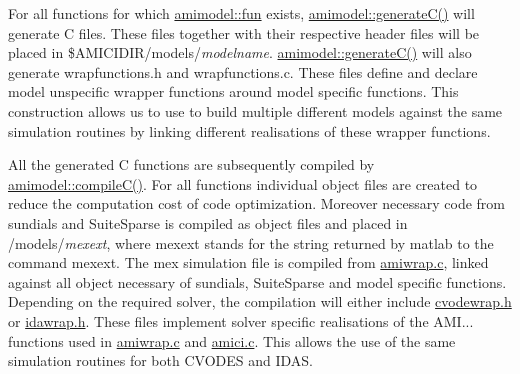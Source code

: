 For all functions for which \hyperlink{classamimodel_a743fa290dbc0a67a3843d5ab0426e9b4}{amimodel\+::fun} exists, \hyperlink{classamimodel_af2ce5001c2320c95471ecb8c3d73bdbb}{amimodel\+::generate\+C()} will generate C files. These files together with their respective header files will be placed in \$\+A\+M\+I\+C\+I\+D\+I\+R/models/{\itshape modelname}. \hyperlink{classamimodel_af2ce5001c2320c95471ecb8c3d73bdbb}{amimodel\+::generate\+C()} will also generate wrapfunctions.\+h and wrapfunctions.\+c. These files define and declare model unspecific wrapper functions around model specific functions. This construction allows us to use to build multiple different models against the same simulation routines by linking different realisations of these wrapper functions.

All the generated C functions are subsequently compiled by \hyperlink{classamimodel_ad1339463ebc3a2e6c6aeda6f63f1b4ed}{amimodel\+::compile\+C()}. For all functions individual object files are created to reduce the computation cost of code optimization. Moreover necessary code from sundials and Suite\+Sparse is compiled as object files and placed in /models/{\itshape mexext}, where mexext stands for the string returned by matlab to the command mexext. The mex simulation file is compiled from \hyperlink{amiwrap_8c}{amiwrap.\+c}, linked against all object necessary of sundials, Suite\+Sparse and model specific functions. Depending on the required solver, the compilation will either include \hyperlink{cvodewrap_8h_source}{cvodewrap.\+h} or \hyperlink{idawrap_8h_source}{idawrap.\+h}. These files implement solver specific realisations of the A\+M\+I... functions used in \hyperlink{amiwrap_8c}{amiwrap.\+c} and \hyperlink{amici_8c}{amici.\+c}. This allows the use of the same simulation routines for both C\+V\+O\+D\+E\+S and I\+D\+A\+S. 